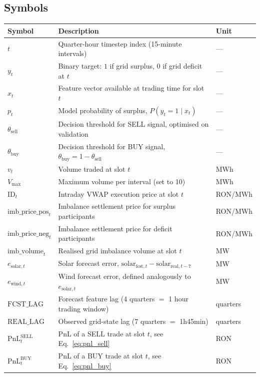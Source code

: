 \documentclass{article}
\begin{document}
\subsection*{Symbols}

\begin{table}[H]
\centering
\begin{tabular}{lll}
\toprule
\textbf{Symbol} & \textbf{Description} & \textbf{Unit} \\
\midrule
$t$ & Quarter-hour timestep index (15-minute intervals) & --- \\
$y_t$ & Binary target: $1$ if grid surplus, $0$ if grid deficit at $t$ & --- \\
$x_t$ & Feature vector available at trading time for slot $t$ & --- \\
$p_t$ & Model probability of surplus, $P(y_t = 1 \mid x_t)$ & --- \\
$\theta_{\text{sell}}$ & Decision threshold for SELL signal, optimised on validation & --- \\
$\theta_{\text{buy}}$ & Decision threshold for BUY signal, $\theta_{\text{buy}} = 1 - \theta_{\text{sell}}$ & --- \\
$v_t$ & Volume traded at slot $t$ & MWh \\
$V_{\max}$ & Maximum volume per interval (set to 10) & MWh \\
$\text{ID}_t$ & Intraday VWAP execution price at slot $t$ & RON/MWh \\
$\text{imb\_price\_pos}_t$ & Imbalance settlement price for surplus participants & RON/MWh \\
$\text{imb\_price\_neg}_t$ & Imbalance settlement price for deficit participants & RON/MWh \\
$\text{imb\_volume}_t$ & Realised grid imbalance volume at slot $t$ & MW \\
$e_{\text{solar},t}$ & Solar forecast error, $\text{solar}_{\text{fcst},t} - \text{solar}_{\text{real},t-7}$ & MW \\
$e_{\text{wind},t}$ & Wind forecast error, defined analogously to $e_{\text{solar},t}$ & MW \\
$\text{FCST\_LAG}$ & Forecast feature lag (4 quarters $=$ 1 hour trading window) & quarters \\
$\text{REAL\_LAG}$ & Observed grid-state lag (7 quarters $=$ 1h45min) & quarters \\
$\text{PnL}_t^{\text{SELL}}$ & PnL of a SELL trade at slot $t$, see Eq.~\eqref{eq:pnl_sell} & RON \\
$\text{PnL}_t^{\text{BUY}}$ & PnL of a BUY trade at slot $t$, see Eq.~\eqref{eq:pnl_buy} & RON \\
\bottomrule
\end{tabular}
\end{table}
\end{document}

